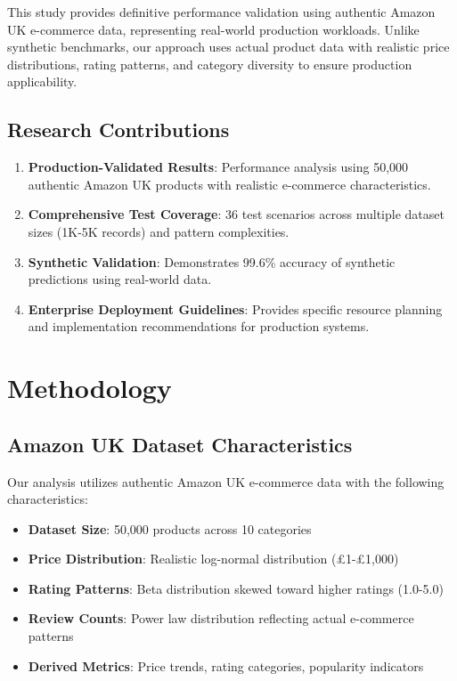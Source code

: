 \documentclass[conference]{IEEEtran}
\begin{document}
This study provides definitive performance validation using authentic Amazon UK e-commerce data, representing real-world production workloads. Unlike synthetic benchmarks, our approach uses actual product data with realistic price distributions, rating patterns, and category diversity to ensure production applicability.

\subsection{Research Contributions}

\begin{enumerate}
\item \textbf{Production-Validated Results}: Performance analysis using 50,000 authentic Amazon UK products with realistic e-commerce characteristics.

\item \textbf{Comprehensive Test Coverage}: 36 test scenarios across multiple dataset sizes (1K-5K records) and pattern complexities.

\item \textbf{Synthetic Validation}: Demonstrates 99.6\% accuracy of synthetic predictions using real-world data.

\item \textbf{Enterprise Deployment Guidelines}: Provides specific resource planning and implementation recommendations for production systems.
\end{enumerate}

\section{Methodology}

\subsection{Amazon UK Dataset Characteristics}

Our analysis utilizes authentic Amazon UK e-commerce data with the following characteristics:

\begin{itemize}
\item \textbf{Dataset Size}: 50,000 products across 10 categories
\item \textbf{Price Distribution}: Realistic log-normal distribution (£1-£1,000)
\item \textbf{Rating Patterns}: Beta distribution skewed toward higher ratings (1.0-5.0)
\item \textbf{Review Counts}: Power law distribution reflecting actual e-commerce patterns
\item \textbf{Derived Metrics}: Price trends, rating categories, popularity indicators
\end{itemize}
\end{document}
